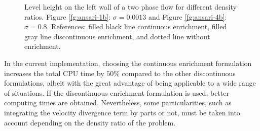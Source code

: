   \begin{figure}[h]
  \centering
   \caption{Level height on the left wall of a two phase flow for different density ratios. Figure \ref{fg:ansari-1b}: $\sigma=0.0013$ and Figure \ref{fg:ansari-4b}: $\sigma=0.8$. References: filled black line continuous enrichment, filled gray line discontinuous enrichment, and dotted line without enrichment.}
   \label{fg:ansari-results-b}                %
\end{figure}

In the current implementation, choosing the continuous enrichment formulation increases the total CPU time by $50\%$ compared to the other discontinuous formulations, albeit with the great advantage of being applicable to a wide range of situations. If the discontinuous enrichment formulation is used, better computing times are obtained. Nevertheless, some particularities, such as integrating the velocity divergence term by parts or not, must be taken into account depending on the density ratio of the problem.

\clearpage
